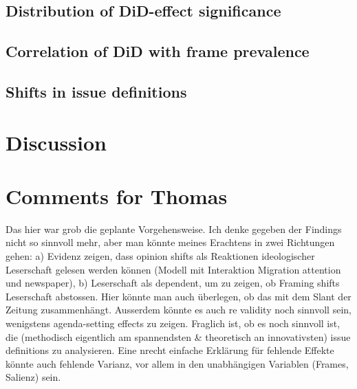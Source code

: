 \documentclass{article}
\begin{document}

\subsection{Distribution of DiD-effect significance}


\subsection{Correlation of DiD with frame prevalence}


\subsection{Shifts in issue definitions}


\section{Discussion}

\newpage

\section{Comments for Thomas}

Das hier war grob die geplante Vorgehensweise. Ich denke gegeben der Findings nicht so sinnvoll mehr, aber man könnte meines Erachtens in zwei Richtungen gehen: a) Evidenz zeigen, dass opinion shifts als Reaktionen ideologischer Leserschaft gelesen werden können (Modell mit Interaktion Migration attention und newspaper), b) Leserschaft als dependent, um zu zeigen, ob Framing shifts Leserschaft abstossen. Hier könnte man auch überlegen, ob das mit dem Slant der Zeitung zusammenhängt. Ausserdem könnte es auch re validity noch sinnvoll sein, wenigstens agenda-setting effects zu zeigen. Fraglich ist, ob es noch sinnvoll ist, die (methodisch eigentlich am spannendsten \& theoretisch an innovativsten) issue definitions zu analysieren. Eine nrecht einfache Erklärung für fehlende Effekte könnte auch fehlende Varianz, vor allem in den unabhängigen Variablen (Frames, Salienz) sein.
\end{document}
